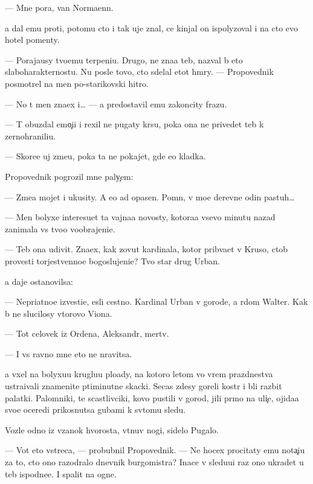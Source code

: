 \documentclass[10pt]{book}
\begin{document}
— Mne pora, van Normaenn.

{\Y}a dal {\y}emu pro{\y}ti, potomu cto i tak uje znal, ce{\y} kinjal on ispolyzoval i na cto {\y}evo hotel pomen{\ia}ty.



— Poraja{\y}usy tvo{\y}emu terpeni{\y}u. Drugo{\y}, ne zna{\y}a teb{\ia}, nazval b{\yi} eto slaboharakternost{\y}u. Nu posle tovo, cto sdelal etot hm{\yi}ry. — Propovednik posmotrel na men{\ia} po-starikovski hitro.

— No t{\yi} men{\ia} zna{\y}ex i… — {\Y}a predostavil {\y}emu zakoncity frazu.

— T{\yi} obuzdal emo{\c}i{\y}i i rexil ne pugaty kr{\yi}su, poka ona ne privedet teb{\ia} k zernohranili{\x}u.

— Skore{\y}e uj zme{\y}u, poka ta ne pokajet, gde {\y}e{\y}o kladka.

Propovednik pogrozil mne paly{\c}em:

— Zme{\y}a mojet i ukusity. A {\y}e{\y}o {\y}ad opasen. Pomn{\iu}, v mo{\y}e{\y} derevne odin pastuh…

— Men{\ia} bolyxe interesu{\y}et ta vajna{\y}a novosty, kotora{\y}a vsevo minutu nazad zanimala vs{\e} tvo{\y}o voobrajeni{\y}e.

— Teb{\ia} ona udivit. Zna{\y}ex, kak zovut kardinala, kotor{\yi}{\y} prib{\yi}va{\y}et v Kruso, ctob{\yi} provesti torjestvenno{\y}e bogoslujeni{\y}e? Tvo{\y} star{\yi}{\y} drug Urban.

{\Y}a daje ostanovilsa:

— Nepri{\y}atno{\y}e izvesti{\y}e, {\y}esli cestno. Kardinal Urban v gorode, a r{\ia}dom Walter. Kak b{\yi} ne slucilosy vtorovo Viona.

— Tot celovek iz Ordena, Aleksandr, mertv.

— I vs{\e} ravno mne eto ne nravitsa.

{\Y}a v{\yi}xel na bolyxu{\y}u kruglu{\y}u plo{\x}ady, na kotoro{\y} letom vo vrem{\ia} prazdnestva ustra{\y}ivali znamenit{\yi}{\y}e p{\ia}timinutn{\yi}{\y}e skacki. Se{\y}cas zdesy goreli kostr{\yi} i b{\yi}li razbit{\yi} palatki. Palomniki, te scastlivciki, kovo pustili v gorod, jili pr{\ia}mo na uli{\c}e, ojida{\y}a svo{\y}e{\y} oceredi prikosnutsa gubami k sv{\ia}tomu sledu.

Vozle odno{\y} iz v{\ia}zanok hvorosta, v{\yi}t{\ia}nuv nogi, sidelo Pugalo.

— Vot eto vstreca, — probubnil Propovednik. — Ne hocex procitaty {\y}emu nota{\c}i{\y}u za to, cto ono razodralo dnevnik burgomistra? Inace v sledu{\y}u{\x}i{\y} raz ono ukradet u teb{\ia} ispodne{\y}e. I spalit na ogne.
\end{document}
